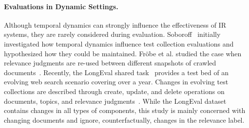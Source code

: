 \paragraph{Evaluations in Dynamic Settings.} Although temporal dynamics can strongly influence the effectiveness of IR systems, they are rarely  considered during evaluation. Soboroff~\cite{DBLP:conf/sigir/Soboroff06} initially investigated how temporal dynamics influence test collection evaluations and hypothesized how they could be maintained. Fr{\"o}be et al. studied the case when relevance judgments are re-used between different snapshots of crawled documents~\cite{froebe:2022d}. Recently, the LongEval shared task~\cite{alkhalifa:2023,DBLP:conf/clef/AlkhalifaBDEAFG24} provides a test bed of an evolving web search scenario covering over a year. Changes in evolving test collections are described through create, update, and delete operations on documents, topics, and relevance judgments~\cite{keller:2024}. While the LongEval dataset contains changes in all types of components, this study is mainly concerned with changing documents and ignore, counterfactually, changes in the relevance label.
